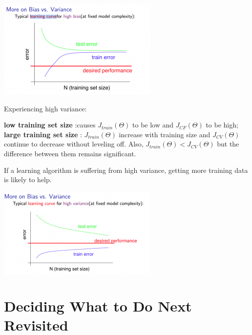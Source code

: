 \documentclass[10pt,a4paper,UTF8]{article}
\begin{document}
\begin{center}
\includegraphics[width=.9\linewidth]{../../img/computer_ng/20171015highBias.png}
\end{center}

Experiencing high variance:

\textbf{low training set size} :causes \(J_{train}(\Theta)\) to be low and \(J_{CF}(\Theta)\) to be high;
\textbf{large training set size} :  \(J_{train}(\Theta)\) increase with training size and  \(J_{CV}(\Theta)\) continue to decrease without leveling off. Also,  \(J_{train}(\Theta) <  J_{CV}(\Theta)\) but the difference between them remains significant.

If a learning algorithm is suffering from high variance, getting more training data is likely to  help.

\begin{center}
\includegraphics[width=.9\linewidth]{../../img/computer_ng/20171015highVariance.png}
\end{center}
\section{Deciding What to Do Next Revisited}
\label{sec:org5dbdcfb}
\end{document}

